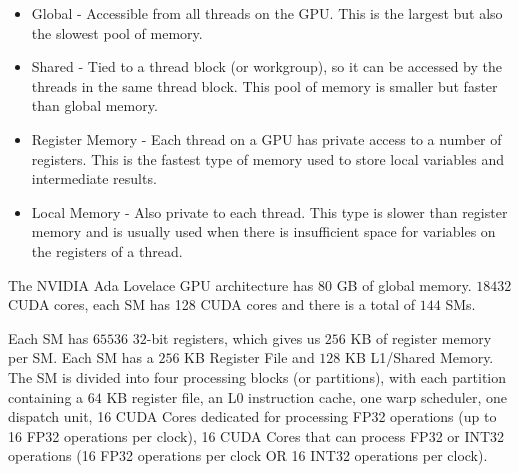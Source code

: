 \begin{itemize}
  \item Global - Accessible from all threads on the GPU. This is the largest but also the slowest pool of memory.
  \item Shared - Tied to a thread block (or workgroup), so it can be accessed by the threads in the same thread block. This pool of memory is smaller but faster than global memory.
  \item Register Memory - Each thread on a GPU has private access to a number of registers. This is the fastest type of memory used to store local variables and intermediate results.
  \item Local Memory - Also private to each thread. This type is slower than register memory and is usually used when there is insufficient space for variables on the registers of a thread.
\end{itemize}





The NVIDIA Ada Lovelace GPU architecture\cite{nvidia-ada-tuning-guide} has $80$ GB of global memory.
$18432$ CUDA cores, each SM has 128 CUDA cores and there is a total of $144$ SMs.

Each SM has $65536$ $32$-bit registers, which gives us $256$ KB of register memory per SM.
Each SM has a $256$ KB Register File and $128$ KB L1/Shared Memory.
The SM is divided into four processing blocks (or partitions), with each partition containing a $64$ KB register file, an L0 instruction cache, one warp scheduler, one dispatch unit, 16 CUDA Cores dedicated for processing FP32 operations (up to 16 FP32 operations per clock), 16 CUDA Cores that can process FP32 or INT32 operations (16 FP32 operations per clock OR 16 INT32 operations per clock).

